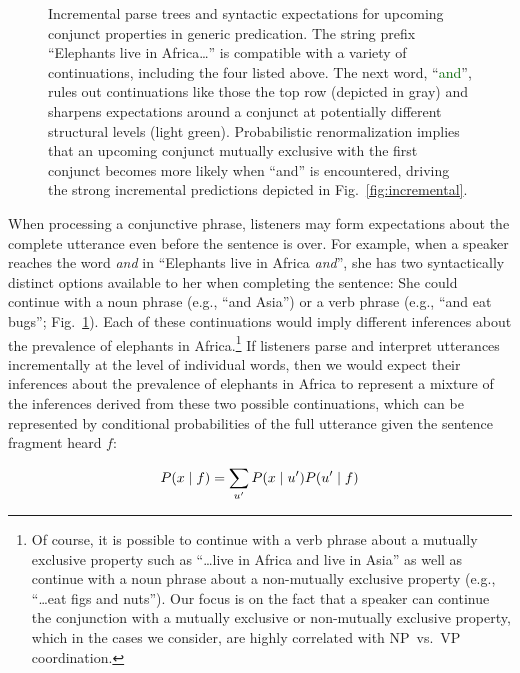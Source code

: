 \documentclass[10pt,letterpaper]{article}
\begin{document}
\begin{figure}
\caption{Incremental parse trees and syntactic expectations for upcoming conjunct properties in generic predication.  The string prefix ``Elephants live in Africa\ldots'' is compatible with a variety of continuations, including the four listed above.  The next word, ``\textcolor{darkgreen}{and}'', rules out continuations like those the top row (depicted in gray) and sharpens expectations around a conjunct at potentially different structural levels (light green).  Probabilistic renormalization implies that an upcoming conjunct mutually exclusive with the first conjunct becomes more likely when ``and'' is encountered, driving the strong incremental predictions depicted in Fig.~\ref{fig:incremental}.}
\label{fig:trees}
        \vspace{-0.5cm}
\end{figure}


When processing a conjunctive phrase, listeners may form expectations about the complete utterance even before the sentence is over. 
For example, when a speaker reaches the word \emph{and} in ``Elephants live in Africa \emph{and}'', she has two syntactically distinct options available to her when completing the sentence: She could continue with a noun phrase (e.g., ``and Asia'') or a verb phrase (e.g., ``and eat bugs''; Fig.~\ref{fig:trees}).
Each of these continuations would imply different inferences about the prevalence of elephants in Africa.\footnote{
	Of course, it is possible to continue with a verb phrase about a mutually exclusive property such as ``\ldots live in Africa and live in Asia'' as well as continue with a noun phrase about a non-mutually exclusive property (e.g., ``\ldots eat figs and nuts''). Our focus is on the fact that a speaker can continue the conjunction with a mutually exclusive or non-mutually exclusive property, which in the cases we consider, are highly correlated with NP~vs.~VP coordination.
}
If listeners parse and interpret utterances incrementally at the level of individual words, then we would expect their inferences about the prevalence of elephants in Africa to represent a mixture of the inferences derived from these two possible continuations, which can be represented by conditional probabilities of the full utterance given the sentence fragment heard $f$:

\vspace{-0.3cm}
\begin{equation}
P(x \mid f) = \sum_{u'} P(x \mid u') P(u' \mid f) 
\label{eq:L0a}
\vspace{-0.3cm}
\end{equation}
\end{document}
